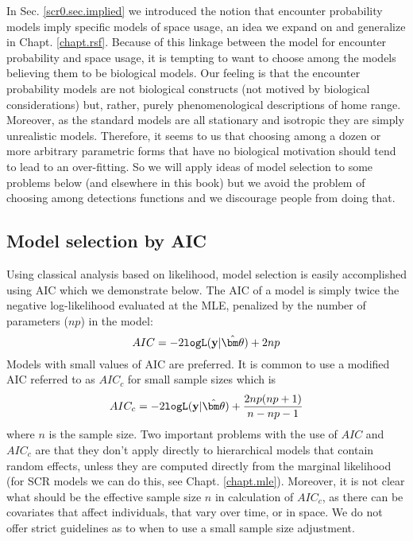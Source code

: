 {} In
Sec. \ref{scr0.sec.implied} we introduced the notion that encounter
probability models imply specific models of space usage, an idea we
expand on and generalize in Chapt. \ref{chapt.rsf}. Because of this
linkage between the model for encounter probability and space usage,
it is tempting to want to choose among the models believing them to be
biological models.  Our feeling is that
the encounter probability
models are not biological constructs (not motived by biological
considerations) but, rather, purely phenomenological descriptions of
home range. Moreover, as the standard models are all stationary and
isotropic they are simply unrealistic models. Therefore, it seems to
us that choosing among a dozen or more arbitrary parametric forms that
have no biological motivation should tend to lead to an over-fitting.
So we will apply ideas of model selection to some problems below (and
elsewhere in this book) but we avoid the problem of choosing among
detections functions and we discourage people from doing that.



\subsection{Model selection by AIC}
\label{gof.sec.aic}

Using classical analysis based on likelihood, model selection
is easily accomplished using AIC \citep{burnham_anderson:2002}
which we demonstrate below. The AIC of a model is simply twice the
negative log-likelihood evaluated at the MLE, penalized by the number of parameters
($np$) in the model:
\[
 AIC = -2 \mbox{\tt logL}({\bf y}|\hat{\bm \theta})  + 2 np
\]
Models with small values of AIC are preferred.
It is common to use a modified AIC referred to as $AIC_{c}$ for small
sample sizes which is
\[
 AIC_{c}  =
-2 \mbox{\tt logL}({\bf y}|\hat{\bm \theta})  + \frac{2 np
  (np+1)}{n-np-1}
\]
where $n$ is the sample size.  Two important problems with the use of
$AIC$ and $AIC_{c}$ are that they don't apply directly to hierarchical
models that contain random effects, unless they are computed directly
from the marginal likelihood (for SCR models we can do this, see
Chapt. \ref{chapt.mle}). Moreover, it is not clear what should be the
effective sample size $n$ in calculation of $AIC_{c}$, as there can be
covariates that affect individuals, that vary over time, or in space.
We do not offer strict guidelines as to when to use a small sample
size adjustment.

